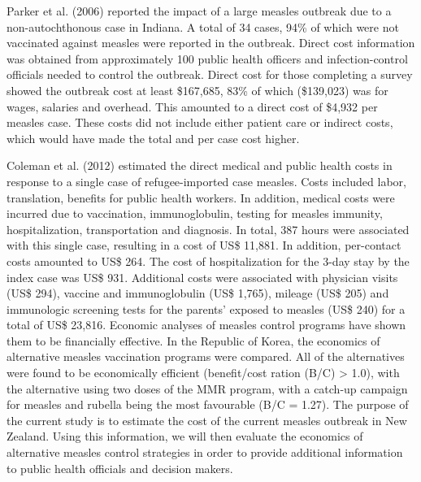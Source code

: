 \documentclass{article}
\begin{document}
Parker et al. (2006) reported the impact of a large measles outbreak due to a non-autochthonous case in Indiana. A total of 34 cases, 94\% of which were not vaccinated against measles were reported in the outbreak. Direct cost information was obtained from approximately 100 public health officers and infection-control officials needed to control the outbreak. Direct cost for those completing a survey showed the outbreak cost at least \$167,685, 83\% of which (\$139,023) was for wages, salaries and overhead. This amounted to a direct cost of \$4,932 per measles case. These costs did not include either patient care or indirect costs, which would have made the total and per case cost higher.

Coleman et al. (2012) estimated the direct medical and public health costs in response to a single case of refugee-imported case measles.  Costs included labor, translation, benefits for public health workers. In addition, medical costs were incurred due to vaccination, immunoglobulin, testing for measles immunity, hospitalization, transportation and diagnosis. In total, 387 hours were associated with this single case, resulting in a cost of US\$ 11,881. In addition, per-contact costs amounted to US\$ 264. The cost of hospitalization for the 3-day stay by the index case was US\$ 931. Additional costs were associated with physician visits (US\$ 294), vaccine and immunoglobulin (US\$ 1,765), mileage (US\$ 205) and immunologic screening tests for the parents' exposed to measles (US\$ 240) for a total of US\$ 23,816.
Economic analyses of measles control programs have shown them to be financially effective. In the Republic of Korea, the economics of alternative measles vaccination programs were compared. All of the alternatives were found to be economically efficient (benefit/cost ration (B/C) > 1.0), with the alternative using two doses of the MMR program, with a catch-up campaign for measles and rubella being the most favourable (B/C = 1.27). 
The purpose of the current study is to estimate the cost of the current measles outbreak in New Zealand. Using this information, we will then evaluate the economics of alternative measles control strategies in order to provide additional information to public health officials and decision makers.
\end{document}
